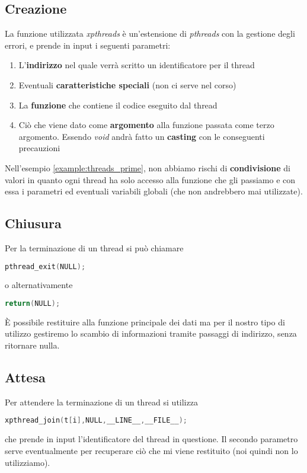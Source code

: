 \subsection{Creazione}
La funzione utilizzata \emph{xpthreads} è un'estensione di \emph{pthreads} con la gestione degli errori, e prende in input i seguenti parametri:
\begin{enumerate}
	\item L'\textbf{indirizzo} nel quale verrà scritto un identificatore per il thread
	\item Eventuali \textbf{caratteristiche speciali} (non ci serve nel corso)
	\item La \textbf{funzione} che contiene il codice eseguito dal thread
	\item  Ciò che viene dato come \textbf{argomento} alla funzione passata come terzo argomento. Essendo \emph{void} andrà fatto un \textbf{casting} con le conseguenti precauzioni
\end{enumerate}
Nell'esempio \ref{example:threads_prime}, non abbiamo rischi di \textbf{condivisione} di valori in quanto ogni thread ha solo accesso alla funzione che gli passiamo e con essa i parametri ed eventuali variabili globali (che non andrebbero mai utilizzate).

\subsection{Chiusura}
Per la terminazione di un thread si può chiamare
\begin{lstlisting}[language=C]
	pthread_exit(NULL);
\end{lstlisting}
o alternativamente
\begin{lstlisting}[language=C]
	return(NULL);
\end{lstlisting}
È possibile restituire alla funzione principale dei dati ma per il nostro tipo di utilizzo gestiremo lo scambio di informazioni tramite passaggi di indirizzo, senza ritornare nulla.

\subsection{Attesa}
Per attendere la terminazione di un thread si utilizza
\begin{lstlisting}[language=C]
	xpthread_join(t[i],NULL,__LINE__,__FILE__);
\end{lstlisting}
che prende in input l'identificatore del thread in questione. Il secondo parametro serve eventualmente per recuperare ciò che mi viene restituito (noi quindi non lo utilizziamo).

